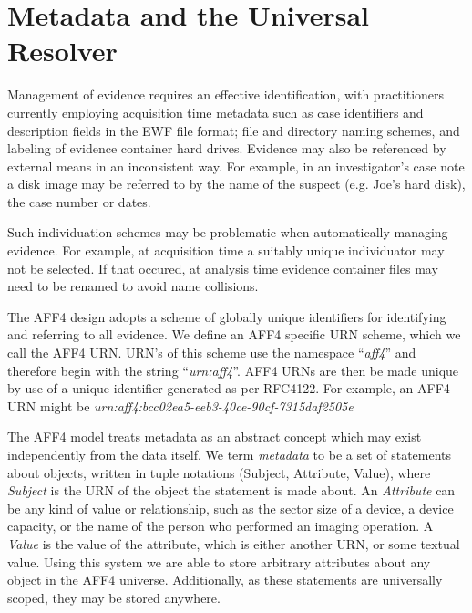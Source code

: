 \documentclass[10pt, conference]{IEEEtran}
\begin{document}
\section{Metadata and the Universal Resolver}
\label{resolver}

Management of evidence requires an effective identification, with
practitioners currently employing acquisition time metadata such as
case identifiers and description fields in the EWF file format; file
and directory naming schemes, and labeling of evidence container hard
drives. Evidence may also be referenced by external means in an
inconsistent way. For example, in an investigator's case note a disk
image may be referred to by the name of the suspect (e.g. Joe's hard
disk), the case number or dates.

Such individuation schemes may be problematic when automatically
managing evidence. For example, at acquisition time a suitably unique
individuator may not be selected. If that occured, at analysis time
evidence container files may need to be renamed to avoid name
collisions.

The AFF4 design adopts a scheme of globally unique identifiers for
identifying and referring to all evidence. We define an AFF4 specific
URN scheme, which we call the AFF4 URN. URN's of this scheme use the
namespace\cite{RFC1737} ``\emph{aff4}'' and therefore begin with the 
string ``\emph{urn:aff4}''. AFF4 URNs are then be made unique by use of 
a unique identifier generated
as per RFC4122\cite{RFC4122}. For example, an AFF4 URN might be
\emph{urn:aff4:bcc02ea5-eeb3-40ce-90cf-7315daf2505e}


The AFF4 model treats metadata as an abstract concept which may exist
independently from the data itself. We term {\em metadata} to be a set
of statements about objects, written in tuple notations (Subject,
Attribute, Value), where {\em Subject} is the URN of the object the
statement is made about. An \emph{Attribute} can be any kind of value or relationship, such
as the sector size of a device, a device capacity, or the name of the
person who performed an imaging operation. A \emph{Value} is the value
of the attribute, which is either another URN, or some textual value. Using this system we are able to store
arbitrary attributes about any object in the AFF4
universe. Additionally, as these statements are universally scoped,
they may be stored anywhere.
\end{document}
